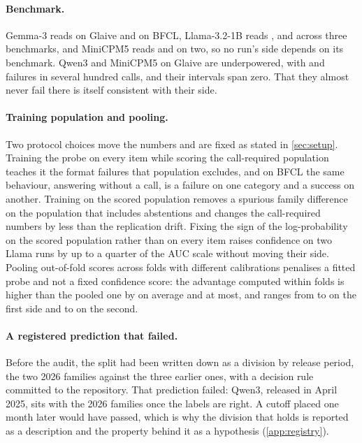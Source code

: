 \paragraph{Benchmark.}
Gemma-3 reads \GapGemmaGlaive{} on Glaive and \GapGemmaBfcl{} on BFCL, Llama-3.2-1B reads \GapLlamaOneBGlaive{}, \GapLlamaOneBBfcl{} and \GapLlamaOneBLive{} across three benchmarks, and MiniCPM5 reads \GapMiniCpmBfcl{} and \GapMiniCpmLive{} on two, so no run's side depends on its benchmark. Qwen3 and MiniCPM5 on Glaive are underpowered, with \nPosQwenThreeGlaive{} and \nPosMiniCpmGlaive{} failures in several hundred calls, and their intervals span zero. That they almost never fail there is itself consistent with their side.

\paragraph{Training population and pooling.}
Two protocol choices move the numbers and are fixed as stated in \cref{sec:setup}. Training the probe on every item while scoring the call-required population teaches it the format failures that population excludes, and on BFCL the same behaviour, answering without a call, is a failure on one category and a success on another. Training on the scored population removes a spurious family difference on the population that includes abstentions and changes the call-required numbers by less than the replication drift. Fixing the sign of the log-probability on the scored population rather than on every item raises confidence on two Llama runs by up to a quarter of the AUC scale without moving their side. Pooling out-of-fold scores across folds with different calibrations penalises a fitted probe and not a fixed confidence score: the advantage computed within folds is higher than the pooled one by \poolShiftMean{} on average and \poolShiftMax{} at most, and ranges from \gapWithinMinInternals{} to \gapWithinMaxInternals{} on the first side and \gapWithinMinConfidence{} to \gapWithinMaxConfidence{} on the second.

\paragraph{A registered prediction that failed.}
Before the audit, the split had been written down as a division by release period, the two 2026 families against the three earlier ones, with a decision rule committed to the repository. That prediction failed: Qwen3, released in April 2025, sits with the 2026 families once the labels are right. A cutoff placed one month later would have passed, which is why the division that holds is reported as a description and the property behind it as a hypothesis (\cref{app:registry}).
